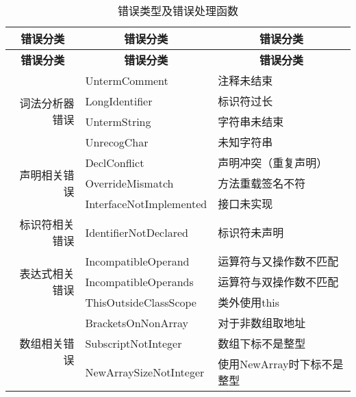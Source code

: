 \begin{center}
    \begin{longtable}{r l l}
        \caption{错误类型及错误处理函数}
        \label{tab:error}\\ %

        \toprule
        \multicolumn{1}{c}{\textbf{错误分类}} &
        \multicolumn{1}{c}{\textbf{错误分类}} &
        \multicolumn{1}{c}{\textbf{错误分类}} \\
        \cmidrule(lr){1-1} \cmidrule(lr){2-2} \cmidrule(lr){3-3}
        \endfirsthead

        \toprule
        \multicolumn{1}{c}{\textbf{错误分类}} &
        \multicolumn{1}{c}{\textbf{错误分类}} &
        \multicolumn{1}{c}{\textbf{错误分类}} \\
        \cmidrule(lr){1-1} \cmidrule(lr){2-2} \cmidrule(lr){3-3}
        \endhead

        \multirow{4}{*}{词法分析器错误}
        & UntermComment & 注释未结束 \\
        & LongIdentifier & 标识符过长 \\
        & UntermString & 字符串未结束 \\
        & UnrecogChar & 未知字符串 \\

        \cmidrule(lr){1-3}
        \multirow{3}{*}{声明相关错误}
        & DeclConflict & 声明冲突（重复声明）\\
        & OverrideMismatch & 方法重载签名不符 \\
        & InterfaceNotImplemented & 接口未实现 \\

        \cmidrule(lr){1-3}
        \multirow{1}{*}{标识符相关错误}
        & IdentifierNotDeclared & 标识符未声明 \\

        \cmidrule(lr){1-3}
        \multirow{3}{*}{表达式相关错误}
        & IncompatibleOperand & 运算符与又操作数不匹配 \\
        & IncompatibleOperands & 运算符与双操作数不匹配 \\
        & ThisOutsideClassScope & 类外使用this \\

        \cmidrule(lr){1-3}
        \multirow{3}{*}{数组相关错误}
        & BracketsOnNonArray & 对于非数组取地址 \\
        & SubscriptNotInteger & 数组下标不是整型 \\
        & NewArraySizeNotInteger & 使用NewArray时下标不是整型 \\


\end{longtable}
\end{center}
